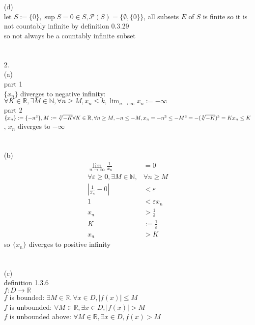 \documentclass[12pt, border = 4pt, multi]{article} %
\begin{document}
\\
\\
(d)\\
let $S := \{0\}, \sup S = 0 \in S, \mathcal{P}(S) = \{\emptyset, \{0\}\}$, all subsets $E$ of $S$ is finite so it is not countably infinite by definition 0.3.29\\
so not always be a countably infinite subset\\
\\
\\
2.\\
(a)\\
part 1\\
$\{x_n\}$ diverges to negative infinity: $\forall K \in \mathbb{R}, \exists M \in \mathbb{N}, \forall n \geq M, x_n \leq k, \lim_{n \rightarrow \infty} x_n := -\infty$\\
part 2\\
$\{x_n\} := \{-n ^ 3\}, M := \sqrt[3]{-K}\\
\forall K \in \mathbb{R}, \forall n \geq M, -n \leq -M, x_n = -n ^ 3 \leq -M ^ 3 = -(\sqrt[3]{-K}) ^ 3 = K\\
x_n \leq K$, $x_n$ diverges to $-\infty$\\
\\
\\
(b)\\
\begin{align*}
\lim_{n \rightarrow \infty} \frac{1}{x_n} &= 0\\
\forall \varepsilon \geq 0, \exists M \in \mathbb{N}, &\forall n \geq M\\
\left|\frac{1}{x_n} - 0\right| &< \varepsilon\\
1 &< \varepsilon x_n\\
x_n &> \frac{1}{\varepsilon}\\
K &:= \frac{1}{\varepsilon}\\
x_n &> K
\end{align*}
so $\{x_n\}$ diverges to positive infinity\\
\\
\\
(c)\\
definition 1.3.6\\
$f: D \rightarrow \mathbb{R}$\\
$f$ is bounded: $\exists M \in \mathbb{R}, \forall x \in D, |f(x)| \leq M$\\
$f$ is unbounded: $\forall M \in \mathbb{R}, \exists x \in D, |f(x)| > M$\\
$f$ is unbounded above: $\forall M \in \mathbb{R}, \exists x \in D, f(x) > M$\\
\end{document}
